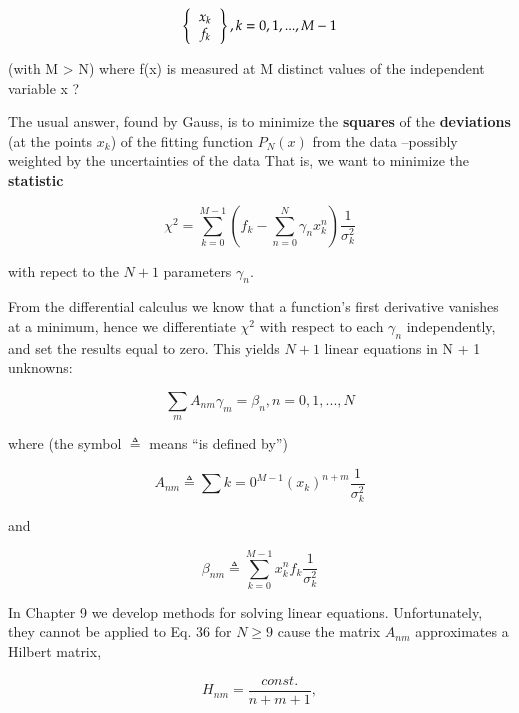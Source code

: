 \begin{equation}
    \left \{
      \begin{tabular}{c}
      $x_{k}$ \\
      $f_{k}$
      \end{tabular}
    \right \}
    , k=0,1, ... , M-1
\end{equation}

(with M > N) where f(x) is measured at M distinct values of the independent variable x ?

The usual answer, found by Gauss, is to minimize the \textbf{squares} of the \textbf{deviations} (at the points $x_k$) of the fitting function $P_N(x)$ from the data --possibly weighted by the uncertainties of the data That is, we want to minimize the \textbf{statistic}

\begin{equation}
\chi^2 = \sum_{k=0}^{M-1} \left( f_k - \sum_{n=0}^{N} \gamma_n x_{k}^n \right) \frac{1}{\sigma_{k}^{2}}
\end{equation}

with repect to the $N + 1$ parameters $\gamma_{n}$.

From the differential calculus we know that a function's first derivative vanishes at a minimum, hence we differentiate $\chi^{2}$ with respect to each $\gamma_{n}$ independently, and set the results equal to zero. This yields $N + 1$ linear equations in N + 1 unknowns:

\begin{equation}
\sum_{m} A_{nm} \gamma_{m} = \beta_{n}, n = 0, 1, ... , N
\end{equation}

where (the symbol $\triangleq$ means “is defined by”)

\begin{equation}
A_{nm} \triangleq \sum{k=0}^{M-1}(x_{k})^{n+m} \frac{1}{\sigma_{k}^{2}}
\end{equation}

and

\begin{equation}
\beta_{nm} \triangleq \sum_{k=0}^{M-1}x_{k}^{n}f_{k}\frac{1}{\sigma_{k}^{2}}
\end{equation}

In Chapter 9 we develop methods for solving linear equations. Unfortunately, they cannot be applied to Eq. 36 for $N \geq 9$ cause the matrix $A_{nm}$ approximates a Hilbert matrix,

\begin{equation}
H_{nm} = \frac{const.}{n+m+1} ,
\end{equation}

